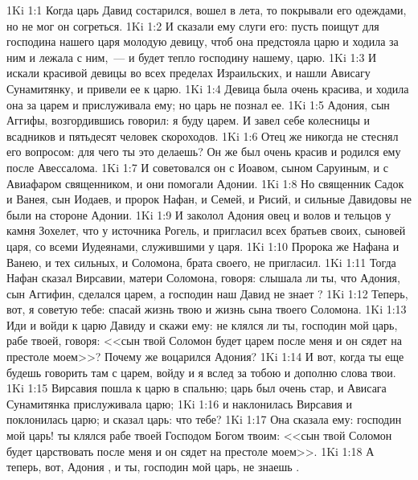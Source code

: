 \vs 1Ki 1:1 Когда царь Давид состарился, вошел в  лета, то покрывали его одеждами, но не мог он согреться.
\vs 1Ki 1:2 И сказали ему слуги его: пусть поищут для господина нашего царя молодую девицу, чтоб она предстояла царю и ходила за ним и лежала с ним,~--- и будет тепло господину нашему, царю.
\vs 1Ki 1:3 И искали красивой девицы во всех пределах Израильских, и нашли Ависагу Сунамитянку, и привели ее к царю.
\vs 1Ki 1:4 Девица была очень красива, и ходила она за царем и прислуживала ему; но царь не познал ее.
\rsbpar\vs 1Ki 1:5 Адония, сын Аггифы, возгордившись говорил: я буду царем. И завел себе колесницы и всадников и пятьдесят человек скороходов.
\vs 1Ki 1:6 Отец же никогда не стеснял его вопросом: для чего ты это делаешь? Он же был очень красив и родился ему после Авессалома.
\vs 1Ki 1:7 И советовался он с Иоавом, сыном Саруиным, и с Авиафаром священником, и они помогали Адонии.
\vs 1Ki 1:8 Но священник Садок и Ванея, сын Иодаев, и пророк Нафан, и Семей, и Рисий, и сильные Давидовы не были на стороне Адонии.
\vs 1Ki 1:9 И заколол Адония овец и волов и тельцов у камня Зохелет, что у источника Рогель, и пригласил всех братьев своих, сыновей царя, со всеми Иудеянами, служившими у царя.
\vs 1Ki 1:10 Пророка же Нафана и Ванею, и тех сильных, и Соломона, брата своего, не пригласил.
\vs 1Ki 1:11 Тогда Нафан сказал Вирсавии, матери Соломона, говоря: слышала ли ты, что Адония, сын Аггифин, сделался царем, а господин наш Давид не знает ?
\vs 1Ki 1:12 Теперь, вот, я советую тебе: спасай жизнь твою и жизнь сына твоего Соломона.
\vs 1Ki 1:13 Иди и войди к царю Давиду и скажи ему: не клялся ли ты, господин мой царь, рабе твоей, говоря: <<сын твой Соломон будет царем после меня и он сядет на престоле моем>>? Почему же воцарился Адония?
\vs 1Ki 1:14 И вот, когда ты еще будешь говорить там с царем, войду и я вслед за тобою и дополню слова твои.
\vs 1Ki 1:15 Вирсавия пошла к царю в спальню; царь был очень стар, и Ависага Сунамитянка прислуживала царю;
\vs 1Ki 1:16 и наклонилась Вирсавия и поклонилась царю; и сказал царь: что тебе?
\vs 1Ki 1:17 Она сказала ему: господин мой царь! ты клялся рабе твоей Господом Богом твоим: <<сын твой Соломон будет царствовать после меня и он сядет на престоле моем>>.
\vs 1Ki 1:18 А теперь, вот, Адония , и ты, господин мой царь, не знаешь .
